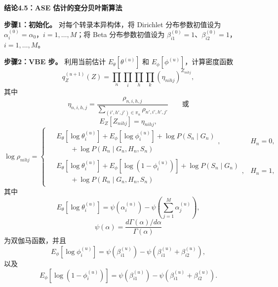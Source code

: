 \par\medskip{}
\noindent\textbf{结论4.5：ASE 估计的变分贝叶斯算法}\par
\noindent\textbf{步骤1：初始化。}
对每个转录本异构体，将 Dirichlet 分布参数初值设为 $\alpha_i^{(0)}=\alpha_0$，$i=1,\ldots,M$；将 Beta 分布参数初值设为 $\beta_{i1}^{(0)}=1$、$\beta_{i2}^{(0)}=1$，$i=1,\ldots,M$。

\noindent\textbf{步骤2：VBE 步。}
利用当前估计 $E_{\theta}[\theta^{(u)}]$ 和 $E_{\phi}[\phi^{(u)}]$，计算密度函数
\begin{equation}
q_Z^{(u+1)}(Z)=\prod_n\prod_i\prod_h\prod_k(\eta_{nihj})^{Z_{nihj}},
\tag{4.49}
\end{equation}
其中
\[
\eta_{n,i,h,j}=\frac{\rho_{n,i,h,j}}{\sum_{(i',h',j')\in\pi_n}\rho_{n',i',h',j'}}\qquad\text{或}
\]
\[
E_Z[Z_{nihj}]=\eta_{nihj},
\]
\[
\log\rho_{nihj}=
\begin{cases}
\begin{aligned}
&E_{\theta}[\log\theta_i^{(u)}]+E_{\phi}[\log\phi_i^{(u)}]+\log P(S_n\mid G_n)\\
&\qquad+\log P(R_n\mid G_n,H_n,S_n)
\end{aligned},&H_n=0,\\[1ex]
\begin{aligned}
&E_{\theta}[\log\theta_i^{(u)}]+E_{\phi}[\log(1-\phi_i^{(u)})]+\log P(S_n\mid G_n)\\
&\qquad+\log P(R_n\mid G_n,H_n,S_n)
\end{aligned},&H_n=1,
\end{cases}
\]
其中
\begin{equation}
E_{\theta}[\log\theta_i^{(u)}]
=\psi(\alpha_i^{(u)})-\psi\left(\sum_{j=1}^{M}\alpha_j^{(u)}\right),
\tag{4.50}
\end{equation}
\[
\psi(\alpha)=\frac{d\Gamma(\alpha)/d\alpha}{\Gamma(\alpha)}
\]
为双伽马函数，并且
\begin{equation}
E_{\phi}[\log\phi_i^{(u)}]
=\psi(\beta_{i1}^{(u)})-\psi(\beta_{i1}^{(u)}+\beta_{i2}^{(u)}),
\tag{4.51}
\end{equation}
以及
\[
E_{\phi}[\log(1-\phi_i^{(u)})]
=\psi(\beta_{i1}^{(u)})-\psi(\beta_{i1}^{(u)}+\beta_{i2}^{(u)}).
\]

